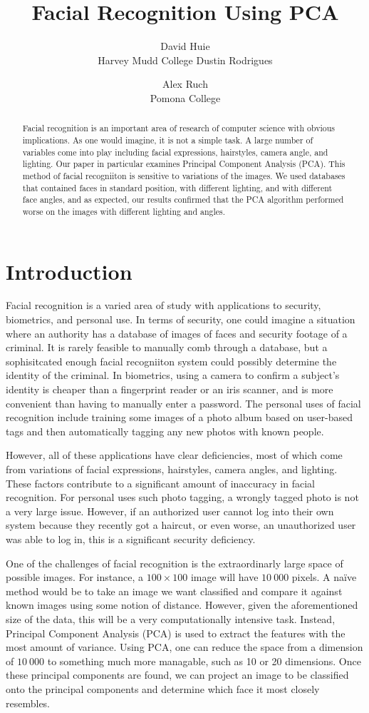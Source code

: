 \documentclass[letterpaper]{article}
\title{Facial Recognition Using PCA}
\author{David Huie \\ Harvey Mudd College \And Dustin Rodrigues \and
Alex Ruch \\ Pomona College}
\begin{document}
\nocite{pca} 
\nocopyright
\maketitle
\begin{abstract}
Facial recognition is an important area of research of computer science with obvious implications. As one would imagine, it is not a simple task.  A large number of variables come into play including facial expressions, hairstyles, camera angle, and lighting. Our paper in particular examines Principal Component Analysis (PCA).  This method of facial recogniiton is sensitive to variations of the images. We used databases that contained faces in standard position, with different lighting, and with different face angles, and as expected, our results confirmed that the PCA algorithm performed worse on the images with different lighting and angles.
\end{abstract}
\section{Introduction}
Facial recognition is a varied area of study with applications to security, biometrics, and personal use.  In terms of security, one could imagine a situation where an authority has a database of images of faces and security footage of a criminal.  It is rarely feasible to manually comb through a database, but a sophisitcated enough facial recogniiton system could possibly determine the identity of the criminal.  In biometrics, using a camera to confirm a subject's identity is cheaper than a fingerprint reader or an iris scanner, and is more convenient than having to manually enter a password.  The personal uses of facial recognition include training some images of a photo album based on user-based tags and then automatically tagging any new photos with known people.

However, all of these applications have clear deficiencies, most of which come from variations of facial expressions, hairstyles, camera angles, and lighting.  These factors contribute to a significant amount of inaccuracy in facial recognition. For personal uses such photo tagging, a wrongly tagged photo is not a very large issue.  However, if an authorized user cannot log into their own system because they recently got a haircut, or even worse, an unauthorized user was able to log in, this is a significant security deficiency. 

One of the challenges of facial recognition is the extraordinarly large space of possible images.  For instance, a $100\times100$ image will have $10\ 000$ pixels. A na\"ive method would be to take an image we want classified and compare it against known images using some notion of distance.  However, given the aforementioned size of the data, this will be a very computationally intensive task.  Instead, Principal Component Analysis (PCA) is used to extract the features with the most amount of variance. Using PCA, one can reduce the space from a dimension of $10\ 000$ to something much more managable, such as 10 or 20 dimensions.  Once these principal components are found, we can project an image to be classified onto the principal components and determine which face it most closely resembles.
\end{document}
